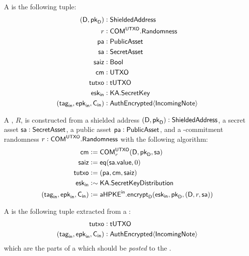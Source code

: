\begin{definition}
    A \Receiver{} is the following tuple:
    \begin{align*}
        (\textsf{D}, \pkD)     &: \ShieldedAddress \\
        r                      &: \COM^\UTXO.\Randomness \\
        \pa                    &: \PublicAsset \\
        \sa                    &: \SecretAsset \\
        \saiz                   &: \Bool \\
        \cm                    &: \UTXO \\
        \tutxo                 &: \TUTXO \\
        \eskin                 &: \KA.\SecretKey \\
        (\tagin, \epkin, \Cin) &: \AuthEncrypted\bra{\IncomingNote}
    \end{align*}
    
    A \Receiver{}, $R$, is constructed from a shielded address $(\textsf{D}, \pkD) : \ShieldedAddress$, a secret asset $\sa : \SecretAsset$, a public asset $\pa : \PublicAsset$, and a 
    \UTXO{}-commitment randomness $r : \COM^\UTXO.\Randomness$ with the following algorithm:
    \begin{align*}
        \cm                    &:= \COM^{\UTXO}_r(\textsf{D}, \pkD, \sa) \\
        \saiz                   &:= \eq(\sa.\VALUE, 0) \\
        \tutxo                 &:= (\pa, \cm, \saiz) \\
        \eskin                 &:\sim \KA.\SecretKeyDistribution \\
        (\tagin, \epkin, \Cin) &:= \aHPKEin.\encrypt_\textsf{D}(\eskin, \pkD, (\textsf{D}, r, \sa))
    \end{align*}
\end{definition}

\begin{definition}
    A \ReceiverPost{} is the following tuple extracted from a \Receiver{}:
    \begin{align*}
        \tutxo                    &: \TUTXO \\
        (\tagin, \epkin, \Cin) &: \AuthEncrypted\bra{\IncomingNote}
    \end{align*}
    which are the parts of a \Receiver{} which should be \emph{posted} to the \Ledger{}.
\end{definition}

